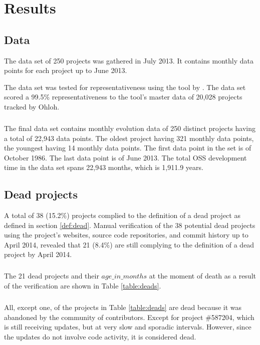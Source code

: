 \chapter{Results}
\label{results}

\section{Data}
The data set of 250 projects was gathered in July 2013. It contains monthly
data points for each project up to June 2013.

The data set was tested for representativeness using the tool by
\citet{nagappan}. The data set scored a 99.5\% representativeness to the tool's
master data of 20,028 projects tracked by Ohloh.

\paragraph{}
The final data set contains monthly evolution data of 250 distinct projects
having a total of 22,943 data points. The oldest project having 321 monthly
data points, the youngest having 14 monthly data points. The first data point
in the set is of October 1986. The last data point is of June 2013. The total
OSS development time in the data set spans 22,943 months, which is 1,911.9
years.

\section{Dead projects}
\label{section:deads}
A total of 38 (15.2\%) projects complied to the definition of a dead project as
defined in section \ref{def:dead}. Manual verification of the 38 potential
dead projects using the project's websites, source code repositories, and
commit history up to April 2014, revealed that 21 (8.4\%) are still complying
to the definition of a dead project by April 2014.

\paragraph{}
The 21 dead projects and their $age\_in\_months$ at the moment of death as a
result of the verification are shown in Table \ref{table:deads}.



\paragraph{}
All, except one, of the projects in Table \ref{table:deads} are dead because it
was abandoned by the community of contributors. Except for project \#587204,
which is still receiving updates, but at very slow and sporadic intervals.
However, since the updates do not involve code activity, it is considered dead.

